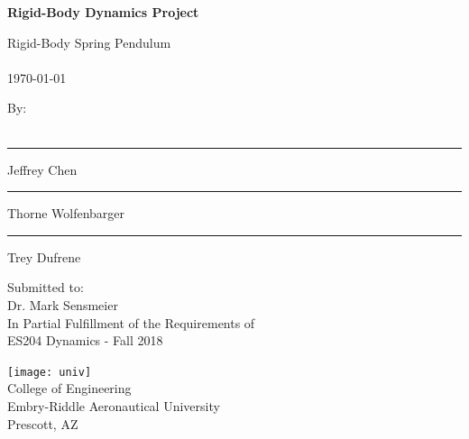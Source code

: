 \begin{titlepage}
  \begin{center}
      \vspace*{1cm}

      \Large
      \textbf{Rigid-Body Dynamics Project}

      \vspace{0.5cm}
      \large
      Rigid-Body Spring Pendulum \\
      ~\\
      \normalsize \today

      \vspace{1.5cm}

      \large
      By: \\
      ~\\
      \normalsize
      \vspace{4ex}
      \begin{multicols}{3}
        \hrule
        \vspace{3ex}
        Jeffrey Chen
        \vfill\null
        \columnbreak
        \hrule
        \vspace{3ex}
        Thorne Wolfenbarger
        \vfill\null
        \columnbreak
        \hrule
        \vspace{3ex}
        Trey Dufrene
        \vfill\null
        \columnbreak
      \end{multicols}
      \vfill

      \vspace{0.8cm}

      \large
      Submitted to: \\
      Dr. Mark Sensmeier \\
      In Partial Fulfillment of the Requirements of \\
      ES204 Dynamics - Fall 2018\\

      \vspace{0.8cm}

      \texttt{[image: univ]}
      ~\\
      College of Engineering\\
      Embry-Riddle Aeronautical University\\
      Prescott, AZ\\

  \end{center}
\end{titlepage}
